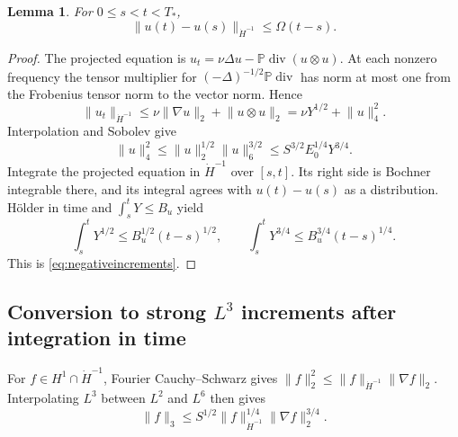 \documentclass[11pt,a4paper]{article}
\newtheorem{lemma}[theorem]{Lemma}
\theoremstyle{definition}\newtheorem{definition}[theorem]{Definition}
\theoremstyle{remark}\newtheorem{remark}[theorem]{Remark}
\newcommand{\PP}{\mathbb P}
\newcommand{\norm}[1]{\lVert #1\rVert}
\newcommand{\diver}{\operatorname{div}}
\numberwithin{equation}{section}
\begin{document}
\begin{lemma}\label{lem:negativeincrements}
For $0\le s<t<T_*$,
\begin{equation}\label{eq:negativeincrements}
 \norm{u(t)-u(s)}_{\dot H^{-1}}\le\Omega(t-s).
\end{equation}
\end{lemma}
\begin{proof}
The projected equation is
$u_t=\nu\Delta u-\PP\diver(u\otimes u)$.
At each nonzero frequency the tensor multiplier for
$(-\Delta)^{-1/2}\PP\diver$ has norm at most one from the Frobenius tensor norm to the vector norm. Hence
\[
 \norm{u_t}_{\dot H^{-1}}
 \le\nu\norm{\nabla u}_2+\norm{u\otimes u}_2
 =\nu Y^{1/2}+\norm u_4^2.
\]
Interpolation and Sobolev give
\[
 \norm u_4^2\le\norm u_2^{1/2}\norm u_6^{3/2}
 \le S^{3/2}E_0^{1/4}Y^{3/4}.
\]
Integrate the projected equation in $\dot H^{-1}$ over $[s,t]$. Its right side is Bochner integrable there, and its integral agrees with $u(t)-u(s)$ as a distribution. H\"older in time and $\int_s^tY\le B_u$ yield
\[
 \int_s^tY^{1/2}\le B_u^{1/2}(t-s)^{1/2},\qquad
 \int_s^tY^{3/4}\le B_u^{3/4}(t-s)^{1/4}.
\]
This is \eqref{eq:negativeincrements}.
\end{proof}

\subsection{Conversion to strong \texorpdfstring{$L^3$}{L3} increments after integration in time}
For $f\in H^1\cap\dot H^{-1}$, Fourier Cauchy--Schwarz gives
$\norm f_2^2\le\norm f_{\dot H^{-1}}\norm{\nabla f}_2$.
Interpolating $L^3$ between $L^2$ and $L^6$ then gives
\begin{equation}\label{eq:negativeinterp}
 \norm f_3\le S^{1/2}\norm f_{\dot H^{-1}}^{1/4}
                         \norm{\nabla f}_2^{3/4}.
\end{equation}
\end{document}
